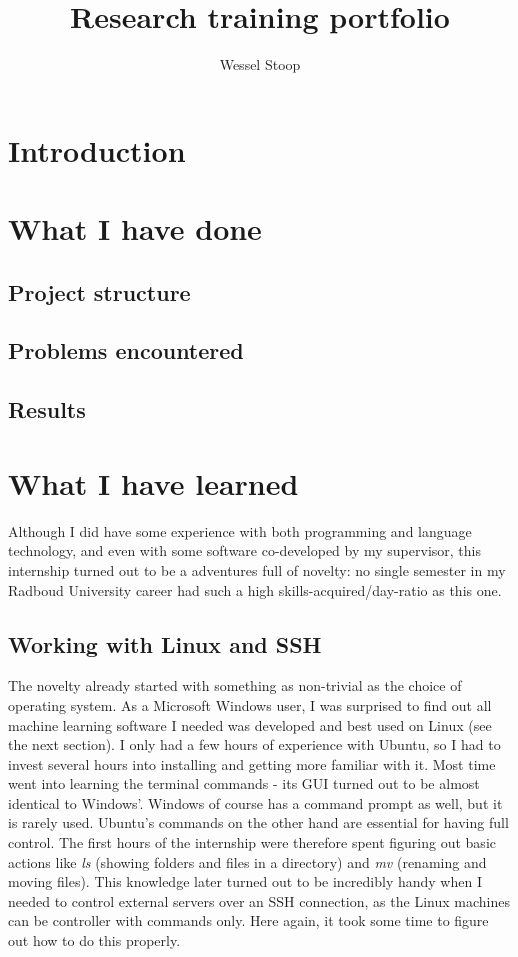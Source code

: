 \documentclass[12pt]{article}
\title{Research training portfolio}
\author{Wessel Stoop}
\begin{document}
\maketitle

\section{Introduction}

\section{What I have done}

\subsection{Project structure}
\subsection{Problems encountered}
\subsection{Results}

\section{What I have learned}
Although I did have some experience with both programming and language technology, and even with some software co-developed by my supervisor, this internship turned out to be a adventures full of novelty: no single semester in my Radboud University career had such a high skills-acquired/day-ratio as this one.

\subsection{Working with Linux and SSH}
The novelty already started with something as non-trivial as the choice of operating system. As a Microsoft Windows user, I was surprised to find out all machine learning software I needed was developed and best used on Linux (see the next section). I only had a few hours of experience with Ubuntu, so I had to invest several hours into installing and getting more familiar with it. Most time went into learning the terminal commands - its GUI turned out to be almost identical to Windows'. Windows of course has a command prompt as well, but it is rarely used. Ubuntu's commands on the other hand are essential for having full control. The first hours of the internship were therefore spent figuring out basic actions like \emph{ls} (showing folders and files in a directory) and \emph{mv} (renaming and moving files). This knowledge later turned out to be incredibly handy when I needed to control external servers over an SSH connection, as the Linux machines can be controller with commands only. Here again, it took some time to figure out how to do this properly. 
\end{document}
